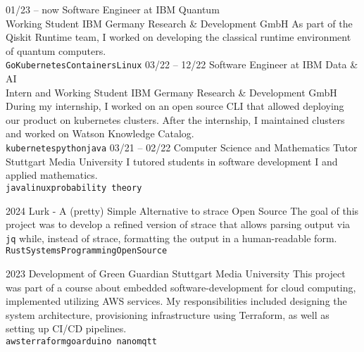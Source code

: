 \documentclass[9pt]{developercv} %
\begin{document}
\begin{entrylist}
	\entry
		{01/23 -- now}
		{Software Engineer at IBM Quantum\\\footnotesize{Working Student}}
		{IBM Germany Research \& Development GmbH}
		{As part of the Qiskit Runtime team, I worked on developing the classical runtime environment of quantum computers.
        \\ \texttt{Go}\slashsep\texttt{Kubernetes}\slashsep\texttt{Containers}\slashsep\texttt{Linux}}
	\entry
		{03/22 -- 12/22}
        {Software Engineer at IBM Data \& AI\\\footnotesize{Intern and Working Student}}
        {IBM Germany Research \& Development GmbH}
		{During my internship, I worked on an open source CLI that allowed deploying our product on kubernetes clusters. After the internship, I maintained clusters and worked on Watson Knowledge Catalog. 
		\\ \texttt{kubernetes}\slashsep\texttt{python}\slashsep\texttt{java}}
	\entry
		{03/21 -- 02/22}
        {Computer Science and Mathematics Tutor}
        {Stuttgart Media University}
		{I tutored students in software development I and applied mathematics.
		\\ \texttt{java}\slashsep\texttt{linux}\slashsep\texttt{probability theory}}
\end{entrylist}



\begin{entrylist}
	\entry
        {2024}
        {Lurk - A (pretty) Simple Alternative to strace}
        {Open Source}
        {The goal of this project was to develop a refined version of strace that allows parsing output via \texttt{jq} while, instead of strace, formatting the output in a human-readable form.
        \\ \texttt{Rust}\slashsep\texttt{SystemsProgramming}\slashsep\texttt{OpenSource}}
        
    \entry
        {2023}
        {Development of Green Guardian}
        {Stuttgart Media University}
        {This project was part of a course about embedded software-development for cloud computing, implemented utilizing AWS services. My responsibilities included designing the system architecture, provisioning infrastructure using Terraform, as well as setting up CI/CD pipelines.
        	\\ \texttt{aws}\slashsep\texttt{terraform}\slashsep\texttt{go}\slashsep\texttt{arduino nano}\slashsep\texttt{mqtt}}
\end{entrylist}
\end{document}
